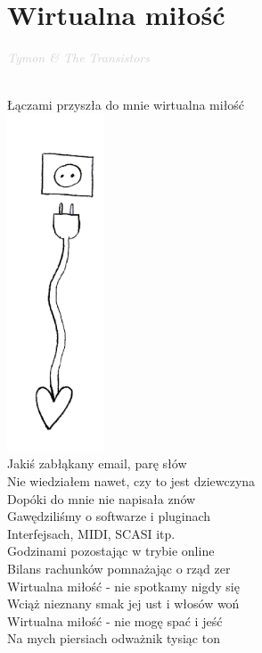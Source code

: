 \documentclass[a5paper, 10pt]{book}
\begin{document}
\section{Wirtualna miłość}\textcolor{lightgray}{\textit{Tymon \& The Transistors}}\\~\\
\begin{minipage}[t]{0.8\textwidth}
Łączami przyszła do mnie wirtualna miłość\\
\includegraphics[height=10cm, right]{wirtualna_milosc.png}\vspace*{-10.1cm}\\
Jakiś zabłąkany email, parę słów\\
Nie wiedziałem nawet, czy to jest dziewczyna\\
Dopóki do mnie nie napisała znów\\
Gawędziliśmy o softwarze i pluginach\\
Interfejsach, MIDI, SCASI itp.\\
Godzinami pozostając w trybie online\\
Bilans rachunków pomnażając o rząd zer\\

\hspace*{5mm}Wirtualna miłość - nie spotkamy nigdy się\\
\hspace*{5mm}Wciąż nieznany smak jej ust i włosów woń\\
\hspace*{5mm}Wirtualna miłość - nie mogę spać i jeść\\
\hspace*{5mm}Na mych piersiach odważnik tysiąc ton\\


\end{minipage}
\end{document}
